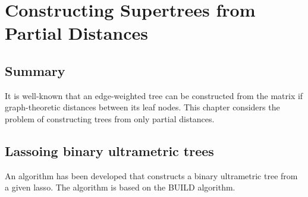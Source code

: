 \chapter{Constructing Supertrees from Partial Distances}
\label{cha:constr-ultr-supertr}

\section{Summary}
\label{sec:con-summary}

It is well-known that an edge-weighted tree can be constructed from the matrix
if graph-theoretic distances between its leaf nodes.  This chapter considers
the problem of constructing trees from only partial distances.

\section{Lassoing binary ultrametric trees}
\label{sec:lass-ultr-trees}

An algorithm has been developed that constructs a binary ultrametric tree from
a given lasso.  The algorithm is based on the \textsc{BUILD} algorithm.



